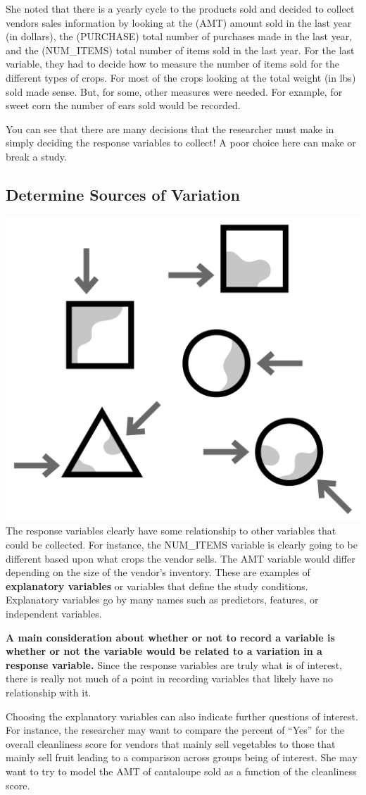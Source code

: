 \documentclass[
]{book}
\theoremstyle{definition}
\theoremstyle{definition}
\theoremstyle{definition}
\theoremstyle{remark}
\begin{document}
She noted that there is a yearly cycle to the products sold and decided to collect vendors sales information by looking at the (AMT) amount sold in the last year (in dollars), the (PURCHASE) total number of purchases made in the last year, and the (NUM\_ITEMS) total number of items sold in the last year. For the last variable, they had to decide how to measure the number of items sold for the different types of crops. For most of the crops looking at the total weight (in lbs) sold made sense. But, for some, other measures were needed. For example, for sweet corn the number of ears sold would be recorded.

You can see that there are many decisions that the researcher must make in simply deciding the response variables to collect! A poor choice here can make or break a study.

\hypertarget{determine-sources-of-variation}{%
\subsection{Determine Sources of Variation}\label{determine-sources-of-variation}}

\includegraphics[width=0.13\linewidth,style="float:left; padding:10px"]{img/determineVariation}
The response variables clearly have some relationship to other variables that could be collected. For instance, the NUM\_ITEMS variable is clearly going to be different based upon what crops the vendor sells. The AMT variable would differ depending on the size of the vendor's inventory. These are examples of \textbf{explanatory variables} or variables that define the study conditions. Explanatory variables go by many names such as predictors, features, or independent variables.

\textbf{A main consideration about whether or not to record a variable is whether or not the variable would be related to a variation in a response variable.} Since the response variables are truly what is of interest, there is really not much of a point in recording variables that likely have no relationship with it.

Choosing the explanatory variables can also indicate further questions of interest. For instance, the researcher may want to compare the percent of ``Yes'' for the overall cleanliness score for vendors that mainly sell vegetables to those that mainly sell fruit leading to a comparison across groups being of interest. She may want to try to model the AMT of cantaloupe sold as a function of the cleanliness score.
\end{document}
